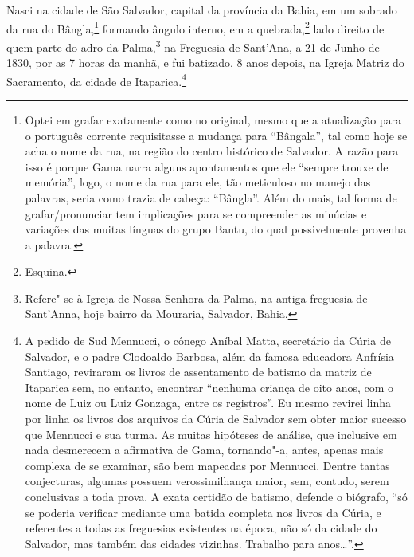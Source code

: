 Nasci na cidade de São Salvador, capital da província da Bahia, em um
sobrado da rua do Bângla,\footnote{Optei em grafar exatamente como no
  original, mesmo que a atualização para o português corrente
  requisitasse a mudança para ``Bângala'', tal como hoje se acha o nome da
  rua, na região do centro histórico de Salvador. A razão para isso é
  porque Gama narra alguns apontamentos que ele ``sempre trouxe de
  memória'', logo, o nome da rua para ele, tão meticuloso no manejo das
  palavras, seria como trazia de cabeça: ``Bângla''. Além do mais, tal
  forma de grafar/pronunciar tem implicações para se compreender as
  minúcias e variações das muitas línguas do grupo Bantu, do qual
  possivelmente provenha a palavra.} formando ângulo interno, em a
quebrada,\footnote{Esquina.} lado direito de quem parte do adro da
Palma,\footnote{Refere"-se à Igreja de Nossa Senhora da Palma, na antiga
  freguesia de Sant'Anna, hoje bairro da Mouraria, Salvador, Bahia.} na
Freguesia de Sant'Ana, a 21 de Junho de 1830, por as 7 horas da manhã, e
fui batizado, 8 anos depois, na Igreja Matriz do Sacramento, da cidade
de Itaparica.\footnote{A pedido de Sud Mennucci, o cônego Aníbal Matta,
  secretário da Cúria de Salvador, e o padre Clodoaldo Barbosa, além da
  famosa educadora Anfrísia Santiago, reviraram os livros de
  assentamento de batismo da matriz de Itaparica sem, no entanto,
  encontrar ``nenhuma criança de oito anos, com o nome de Luiz ou Luiz
  Gonzaga, entre os registros''. Eu mesmo revirei linha por linha os
  livros dos arquivos da Cúria de Salvador sem obter maior sucesso que
  Mennucci e sua turma. As muitas hipóteses de análise, que inclusive em
  nada desmerecem a afirmativa de Gama, tornando"-a, antes, apenas mais
  complexa de se examinar, são bem mapeadas por Mennucci. Dentre tantas
  conjecturas, algumas possuem verossimilhança maior, sem, contudo,
  serem conclusivas a toda prova. A exata certidão de batismo, defende o
  biógrafo, ``só se poderia verificar mediante uma batida completa nos
  livros da Cúria, e referentes a todas as freguesias existentes na
  época, não só da cidade do Salvador, mas também das cidades vizinhas.
  Trabalho para anos\ldots{}''.}

